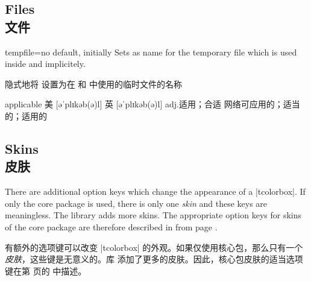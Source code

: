 
\setcounter{section}{4}
\setcounter{subsection}{17}
\setcounter{subsubsection}{0}

\setcounter{section}{4}
\setcounter{subsection}{18}
\setcounter{subsubsection}{0}


\subsection{Files\\文件}
\begin{docTcbKey}{tempfile}{=}{no default, initially }
Sets  as name for the temporary file which is used inside
 and  implicitely.

隐式地将   设置为在  和  中使用的临时文件的名称
\end{docTcbKey}
applicable
美 [əˈplɪkəb(ə)l]
英 [əˈplɪkəb(ə)l]
adj.适用；合适
网络可应用的；适当的；适用的
\setcounter{section}{4}
\setcounter{subsection}{19}
\setcounter{subsubsection}{0}



\setcounter{section}{4}
\setcounter{subsection}{20}
\setcounter{subsubsection}{0}

\subsection{Skins\\皮肤}
There are additional option keys which change the appearance of a |tcolorbox|.
If only the core package is used, there is only one \emph{skin} and these
keys are meaningless.
The library  adds more skins. The appropriate option keys for skins of
the core package are therefore described in  from
page \pageref{sec:skincorekeys}.

有额外的选项键可以改变 |tcolorbox| 的外观。如果仅使用核心包，那么只有一个\emph{皮肤}，这些键是无意义的。库  添加了更多的皮肤。因此，核心包皮肤的适当选项键在第 \pageref{sec:skincorekeys} 页的  中描述。
\setcounter{section}{4}
\setcounter{subsection}{21}
\setcounter{subsubsection}{0}

\setcounter{section}{4}
\setcounter{subsection}{22}
\setcounter{subsubsection}{0}
\setcounter{section}{4}
\setcounter{subsection}{23}
\setcounter{subsubsection}{0}
 
